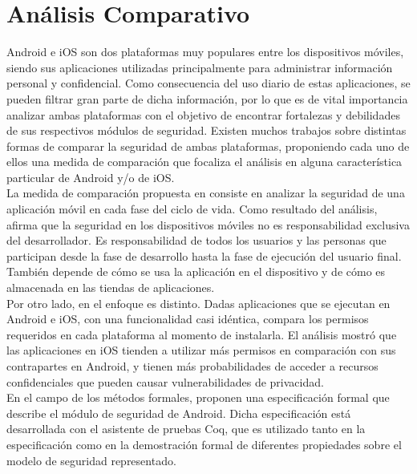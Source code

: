 \chapter{Análisis Comparativo} \label{analisis-comparativo}
Android e iOS son dos plataformas muy populares entre los dispositivos móviles, siendo sus aplicaciones utilizadas principalmente para administrar información personal y confidencial. Como consecuencia del uso diario de estas aplicaciones, se pueden filtrar     gran parte de dicha información, por lo que es de vital importancia analizar ambas plataformas con el objetivo de encontrar fortalezas y debilidades de sus respectivos módulos de seguridad. Existen muchos trabajos sobre distintas formas de comparar la seguridad de ambas plataformas, proponiendo cada uno de ellos una medida de comparación que focaliza el análisis en alguna característica particular de Android y/o de iOS.\\

La medida de comparación propuesta en \cite{YA2014} consiste en analizar la seguridad de una aplicación móvil en cada fase del ciclo de vida. Como resultado del análisis, afirma que la seguridad en los dispositivos móviles no es responsabilidad exclusiva del desarrollador. Es responsabilidad de todos los usuarios y las personas que participan desde la fase de desarrollo hasta la fase de ejecución del usuario final. También depende de cómo se usa la aplicación en el dispositivo y de cómo es almacenada en las tiendas de aplicaciones.\\

Por otro lado, en \cite{HYGZD13} el enfoque es distinto. Dadas aplicaciones que se ejecutan en Android e iOS, con una funcionalidad casi idéntica, compara los permisos requeridos en cada plataforma al momento de instalarla. El análisis mostró que las aplicaciones en iOS tienden a utilizar más permisos en comparación con sus contrapartes en Android, y tienen más probabilidades de acceder a recursos confidenciales que pueden causar vulnerabilidades de privacidad.\\

En el campo de los métodos formales, \cite{Gor16, BCLR15, Rom14} proponen una especificación formal que describe el módulo de seguridad de Android. Dicha especificación está desarrollada con el asistente de pruebas Coq, que es utilizado tanto en la especificación como en la demostración formal de diferentes propiedades sobre el modelo de seguridad representado.\\


